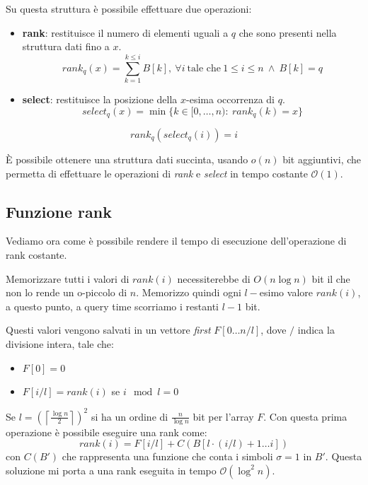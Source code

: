 Su questa struttura è possibile effettuare due operazioni:
\begin{itemize}
    \item \textbf{rank}: restituisce il numero di elementi uguali a $q$ che sono presenti nella struttura dati fino a $x$.
    \begin{equation}
        rank_q(x) = \sum_{k = 1}^{k \leq i} B[k], \ \forall i \ \text{tale che} \ 1 \leq i \leq n \ \land \ B[k] = q
    \end{equation}
    \item \textbf{select}: restituisce la posizione della $x$-esima occorrenza di $q$.
    \begin{equation}
        select_q(x) = \min{\{k \in [0, \dots, n): \ rank_q(k) = x\}}
    \end{equation}
\end{itemize}
\begin{nota}
    \begin{equation}
        rank_q(select_q(i)) = i
    \end{equation}
\end{nota}

È possibile ottenere una struttura dati succinta, usando $o(n)$ bit aggiuntivi, che permetta di effettuare le operazioni di \textit{rank} e \textit{select} in tempo costante $\mathcal{O}(1)$.
\subsection{Funzione rank}
Vediamo ora come è possibile rendere il tempo di esecuzione dell'operazione di rank costante. 

Memorizzare tutti i valori di $rank(i)$ necessiterebbe di $O(n \log n)$ bit il che non lo rende un o-piccolo di $n$. Memorizzo quindi ogni $l-$esimo valore $rank(i)$, a questo punto, a query time scorriamo i restanti $l-1$ bit.

Questi valori vengono salvati in un vettore \textit{first} $F[0 \dots n / l]$, dove $/$ indica la divisione intera, tale che:
\begin{itemize}
    \item $F[0] = 0$
    \item $F[i / l] = rank(i)$ se $i \mod l = 0$
\end{itemize}

Se $l = \left(\left\lceil \frac{\log n}{2} \right\rceil \right)^2$ si ha un ordine di $\frac{n}{\log n}$ bit per l'array $F$. Con questa prima operazione è possibile eseguire una rank come:
\begin{equation}
    rank(i) = F[i/l] + C(B[l \cdot (i / l) + 1 \dots i])
\end{equation}
con $C(B')$ che rappresenta una funzione che conta i simboli $\sigma = 1$ in $B'$. Questa soluzione mi porta a una rank eseguita in tempo $\mathcal{O}( \log^2 n )$.

